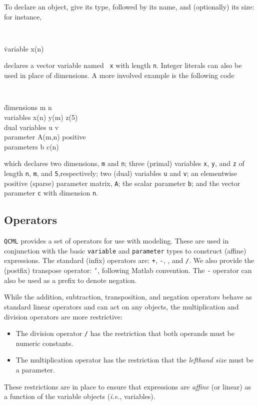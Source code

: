 \documentclass[11pt]{article}
\def\qcml{\texttt{QCML}\xspace}
\newcommand{\ie}{{\it i.e.}}
\begin{document}
To declare an object, give its type, followed by its name, and (optionally)
its size: for instance,
{\tt
\begin{tabbing}
  \qquad \= variable x(n)
\end{tabbing}}
\noindent declares a vector variable named {\tt
x} with length {\tt n}.
Integer literals can also be used in place of dimensions. A more involved
example is the following code
{\tt
\begin{tabbing}
  \qquad \= dimensions m n \\
  \> variables x(n) y(m) z(5)\\
  \> dual variables u v \\
  \> parameter A(m,n) positive \\
  \> parameters b c(n)
\end{tabbing}}
\noindent which declares two dimensions, {\tt m} and {\tt n}; three
(primal) variables {\tt x}, {\tt y}, and {\tt z} of length {\tt n},
{\tt m}, and {\tt 5},respectively; two (dual) variables {\tt u} and
{\tt v}; an elementwise positive (sparse) parameter matrix, {\tt A}; the
scalar parameter {\tt b}; and the vector parameter {\tt c} with dimension
{\tt n}.

\subsection{Operators}
\qcml provides a set of operators for use with modeling. These are used in
conjunction with the basic {\tt variable} and {\tt parameter} types to
construct (affine) expressions. The standard (infix) operators are: {\tt +},
{\tt -}, {\tt *}, and {\tt /}. We also provide the (postfix) transpose
operator: {\tt '}, following Matlab convention. The {\tt -}
operator can also be used as a prefix to denote negation.

While the addition, subtraction, transposition, and negation operators
behave as standard linear operators and can act on any objects, the
multiplication and division operators are more restrictive:
\begin{itemize}
\item The division operator {\tt /} has the restriction that both operands
must be numeric constants.
\item The multiplication operator {\tt *} has the restriction that the
\emph{lefthand size} must be a parameter.
\end{itemize}
These restrictions are in place to ensure that expressions are \emph{affine}
(or linear) as a function of the variable objects (\ie, variables).
\end{document}
